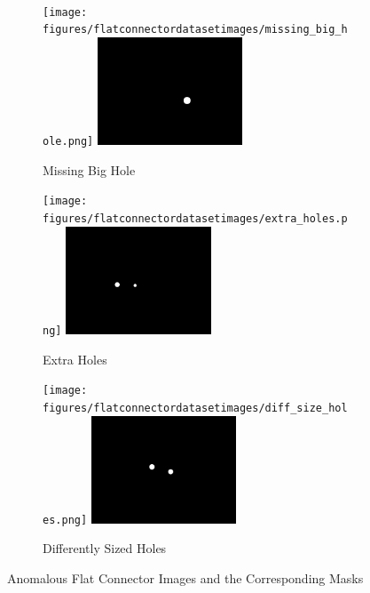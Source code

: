 \begin{figure}[ht]
\begin{subfigure}[b]{0.3\textwidth}
    \end{subfigure}
    \\
    \begin{subfigure}[b]{0.3\textwidth}
        \centering
        \texttt{[image: figures/flatconnectordatasetimages/missing\_big\_hole.png]}
        \includegraphics[width=0.475\textwidth]{figures/flatconnectordatasetimages/missing_big_hole_mask.png}
        \caption*{Missing Big Hole}

    \end{subfigure}
    \hfill
    \begin{subfigure}[b]{0.3\textwidth}
        \centering
        \texttt{[image: figures/flatconnectordatasetimages/extra\_holes.png]}
        \includegraphics[width=0.475\textwidth]{figures/flatconnectordatasetimages/extra_holes_mask.png}
        \caption*{Extra Holes}

    \end{subfigure}
    \hfill
    \begin{subfigure}[b]{0.3\textwidth}
        \centering
        \texttt{[image: figures/flatconnectordatasetimages/diff\_size\_holes.png]}
        \includegraphics[width=0.475\textwidth]{figures/flatconnectordatasetimages/diff_size_holes_mask.png}
        \caption*{Differently Sized Holes}

    \end{subfigure}
    \caption{Anomalous Flat Connector Images and the Corresponding Masks}
    \label{fig:flatconnectorexampleimages}
\end{figure}


